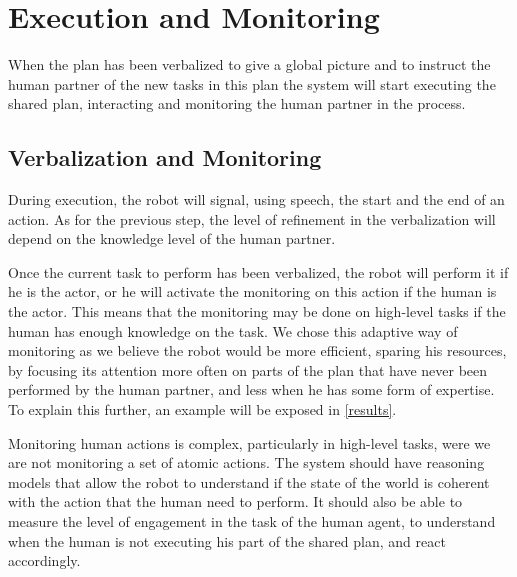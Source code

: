 \documentclass{llncs}
\begin{document}
%

\section{Execution and Monitoring}
\label{execution}

When the plan has been verbalized to give a global picture and to instruct the human partner of the new tasks in this plan the system will start executing the shared plan, interacting and monitoring the human partner in the process.

\subsection{Verbalization and Monitoring}
During execution, the robot will signal, using speech, the start and the end of an action. As for the previous step, the level of refinement in the verbalization will depend on the knowledge level of the human partner.


Once the current task to perform has been verbalized, the robot will perform it if he is the actor, or he will activate the monitoring on this action if the human is the actor. This means that the monitoring may be done on high-level tasks if the human has enough knowledge on the task.
We chose this adaptive way of monitoring as we believe the robot would be more efficient, sparing his resources, by focusing its attention more often on parts of the plan that have never been performed by the human partner, and less when he has some form of expertise.
To explain this further, an example will be exposed in \ref{results}.

Monitoring human actions is complex, particularly in high-level tasks, were we are not monitoring a set of atomic actions. The system should have reasoning models that allow the robot to understand if the state of the world is coherent with the action that the human need to perform. It should also be able to measure the level of engagement in the task of the human agent, to understand when the human is not executing his part of the shared plan, and react accordingly.
\end{document}
